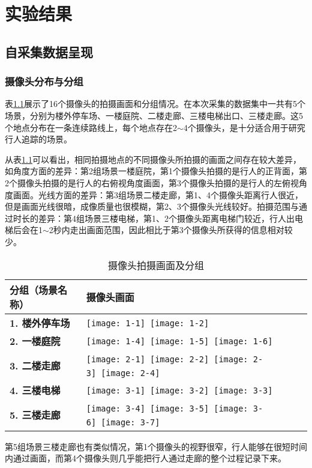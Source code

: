 \chapter{实验结果}

\section{自采集数据呈现}

\subsection{摄像头分布与分组}

表\ref{tab:cameraslayout}展示了16个摄像头的拍摄画面和分组情况。在本次采集的数据集中一共有5个场景，分别为楼外停车场、一楼庭院、二楼走廊、三楼电梯出口、三楼走廊。这5个地点分布在一条连续路线上，每个地点存在2$\sim$4个摄像头，是十分适合用于研究行人追踪的场景。

从表\ref{tab:cameraslayout}可以看出，相同拍摄地点的不同摄像头所拍摄的画面之间存在较大差异，如角度方面的差异：第2组场景一楼庭院，第1个摄像头拍摄的是行人的正背面，第2个摄像头拍摄的是行人的右俯视角度画面，第3个摄像头拍摄的是行人的左俯视角度画面。光线方面的差异：第3组场景二楼走廊，第1、4个摄像头距离行人很近，但是画面光线很暗，成像质量也很模糊，第2、3个摄像头光线较好。拍摄范围与通过时长的差异：第4组场景三楼电梯，第1、2个摄像头距离电梯门较近，行人出电梯后会在1$\sim$2秒内走出画面范围，因此相比于第3个摄像头所获得的信息相对较少。
\begin{table}[ht]
\centering
\caption{摄像头拍摄画面及分组}
\label{tab:cameraslayout}
\renewcommand{\arraystretch}{1.5}%
\begin{tabular}{>{\centering\bfseries}m{} >{\centering\arraybackslash}m{}}
\toprule
分组（场景名称） & \textbf{摄像头画面} \\
\midrule
1. 楼外停车场 & \texttt{[image: 1-1]}~\texttt{[image: 1-2]} \\
2. 一楼庭院 & \texttt{[image: 1-4]}~\texttt{[image: 1-5]}~\texttt{[image: 1-6]} \\
3. 二楼走廊 & \texttt{[image: 2-1]}~\texttt{[image: 2-2]}~\texttt{[image: 2-3]}~\texttt{[image: 2-4]} \\
4. 三楼电梯 & \texttt{[image: 3-1]}~\texttt{[image: 3-2]}~\texttt{[image: 3-3]} \\
5. 三楼走廊 & \texttt{[image: 3-4]}~\texttt{[image: 3-5]}~\texttt{[image: 3-6]}~\texttt{[image: 3-7]} \\
\bottomrule
\end{tabular}
\end{table}
第5组场景三楼走廊也有类似情况，第1个摄像头的视野很窄，行人能够在很短时间内通过画面，而第4个摄像头则几乎能把行人通过走廊的整个过程记录下来。

